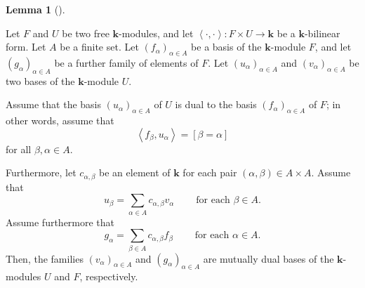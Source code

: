 \documentclass[numbers=enddot,12pt,final,onecolumn,notitlepage]{scrartcl}%
\theoremstyle{definition}
\newtheorem{lem}[theo]{Lemma}
\newenvironment{lemma}[1][]
{\begin{lem}[#1]\begin{leftbar}}
{\end{leftbar}\end{lem}}
\let\sumnonlimits\sum
\renewcommand{\sum}{\sumnonlimits\limits}
\begin{document}
\begin{lemma}
\label{lem.dual-bases-crit}Let $F$ and $U$ be two free $\mathbf{k}$-modules,
and let $\left\langle \cdot,\cdot\right\rangle :F\times U\rightarrow
\mathbf{k}$ be a $\mathbf{k}$-bilinear form. Let $A$ be a finite set. Let
$\left(  f_{\alpha}\right)  _{\alpha\in A}$ be a basis of the $\mathbf{k}%
$-module $F$, and let $\left(  g_{\alpha}\right)  _{\alpha\in A}$ be a further
family of elements of $F$. Let $\left(  u_{\alpha}\right)  _{\alpha\in A}$ and
$\left(  v_{\alpha}\right)  _{\alpha\in A}$ be two bases of the $\mathbf{k}%
$-module $U$.

Assume that the basis $\left(  u_{\alpha}\right)  _{\alpha\in A}$ of $U$ is
dual to the basis $\left(  f_{\alpha}\right)  _{\alpha\in A}$ of $F$; in other
words, assume that%
\begin{equation}
\left\langle f_{\beta},u_{\alpha}\right\rangle =\left[  \beta=\alpha\right]
\label{eq.lem.dual-bases-crit.dual}%
\end{equation}
for all $\beta,\alpha\in A$.

Furthermore, let $c_{\alpha,\beta}$ be an element of $\mathbf{k}$ for each
pair $\left(  \alpha,\beta\right)  \in A\times A$. Assume that%
\begin{equation}
u_{\beta}=\sum_{\alpha\in A}c_{\alpha,\beta}v_{\alpha}%
\ \ \ \ \ \ \ \ \ \ \text{for each }\beta\in A.
\label{eq.lem.dual-bases-crit.u-v}%
\end{equation}
Assume furthermore that%
\begin{equation}
g_{\alpha}=\sum_{\beta\in A}c_{\alpha,\beta}f_{\beta}%
\ \ \ \ \ \ \ \ \ \ \text{for each }\alpha\in A.
\label{eq.lem.dual-bases-crit.g-f}%
\end{equation}
Then, the families $\left(  v_{\alpha}\right)  _{\alpha\in A}$ and $\left(
g_{\alpha}\right)  _{\alpha\in A}$ are mutually dual bases of the $\mathbf{k}%
$-modules $U$ and $F$, respectively.
\end{lemma}
\end{document}
